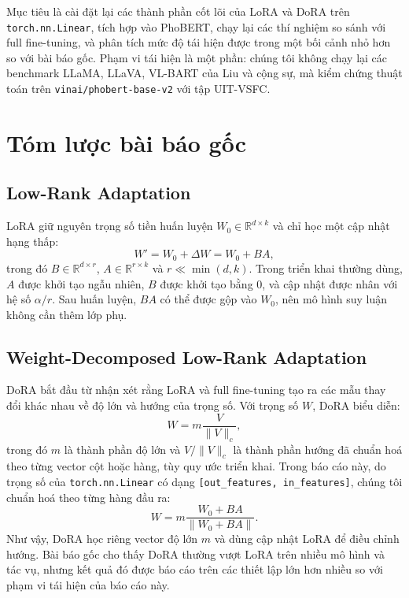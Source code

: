 \documentclass{article}
\theoremstyle{plain}
\theoremstyle{definition}
\begin{document}
Mục tiêu là cài đặt lại các thành phần cốt lõi của LoRA và DoRA trên \texttt{torch.nn.Linear}, tích hợp vào PhoBERT, chạy lại các thí nghiệm so sánh với full fine-tuning, và phân tích mức độ tái hiện được trong một bối cảnh nhỏ hơn so với bài báo gốc. Phạm vi tái hiện là một phần: chúng tôi không chạy lại các benchmark LLaMA, LLaVA, VL-BART của Liu và cộng sự, mà kiểm chứng thuật toán trên \texttt{vinai/phobert-base-v2} với tập UIT-VSFC.

\section{Tóm lược bài báo gốc}

\subsection{Low-Rank Adaptation}

LoRA giữ nguyên trọng số tiền huấn luyện $W_0 \in \mathbb{R}^{d \times k}$ và chỉ học một cập nhật hạng thấp:
\begin{equation}
W' = W_0 + \Delta W = W_0 + BA,
\end{equation}
trong đó $B \in \mathbb{R}^{d \times r}$, $A \in \mathbb{R}^{r \times k}$ và $r \ll \min(d,k)$. Trong triển khai thường dùng, $A$ được khởi tạo ngẫu nhiên, $B$ được khởi tạo bằng 0, và cập nhật được nhân với hệ số $\alpha/r$. Sau huấn luyện, $BA$ có thể được gộp vào $W_0$, nên mô hình suy luận không cần thêm lớp phụ.

\subsection{Weight-Decomposed Low-Rank Adaptation}

DoRA bắt đầu từ nhận xét rằng LoRA và full fine-tuning tạo ra các mẫu thay đổi khác nhau về độ lớn và hướng của trọng số. Với trọng số $W$, DoRA biểu diễn:
\begin{equation}
W = m \frac{V}{\|V\|_c},
\end{equation}
trong đó $m$ là thành phần độ lớn và $V/\|V\|_c$ là thành phần hướng đã chuẩn hoá theo từng vector cột hoặc hàng, tùy quy ước triển khai. Trong báo cáo này, do trọng số của \texttt{torch.nn.Linear} có dạng \texttt{[out\_features, in\_features]}, chúng tôi chuẩn hoá theo từng hàng đầu ra:
\begin{equation}
W = m \frac{W_0 + BA}{\|W_0 + BA\|}.
\end{equation}
Như vậy, DoRA học riêng vector độ lớn $m$ và dùng cập nhật LoRA để điều chỉnh hướng. Bài báo gốc cho thấy DoRA thường vượt LoRA trên nhiều mô hình và tác vụ, nhưng kết quả đó được báo cáo trên các thiết lập lớn hơn nhiều so với phạm vi tái hiện của báo cáo này.
\end{document}
